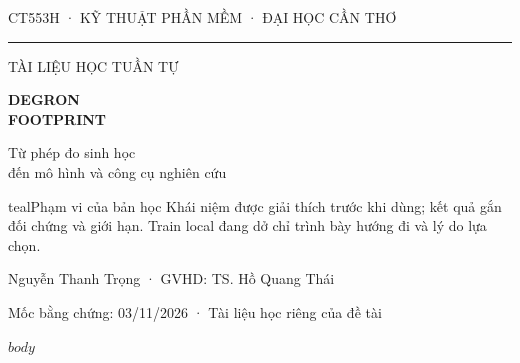 \documentclass[11pt,a4paper,oneside]{report}
\begin{document}
\begin{titlepage}
\color{ink}\sffamily
{\small CT553H · KỸ THUẬT PHẦN MỀM · ĐẠI HỌC CẦN THƠ}\par
\vspace{12mm}
{\color{teal}\rule{\textwidth}{1.3pt}}\par
\vspace{9mm}
{\fontsize{13}{17}\selectfont TÀI LIỆU HỌC TUẦN TỰ}\par
\vspace{7mm}
{\fontsize{34}{40}\selectfont\bfseries DEGRON\\FOOTPRINT}\par
\vspace{9mm}
{\fontsize{17}{23}\selectfont Từ phép đo sinh học\\đến mô hình và công cụ nghiên cứu}\par
\vspace{13mm}
\vfill
\begin{learningbox}{teal}{Phạm vi của bản học}
Khái niệm được giải thích trước khi dùng; kết quả gắn đối chứng và giới hạn.
Train local đang dở chỉ trình bày hướng đi và lý do lựa chọn.
\end{learningbox}
\vspace{4mm}
{\normalsize Nguyễn Thanh Trọng · GVHD: TS. Hồ Quang Thái}\par
\vspace{3mm}
{\small Mốc bằng chứng: 03/11/2026 · Tài liệu học riêng của đề tài}\par
\end{titlepage}
\tableofcontents
\clearpage
\listoffigures
\clearpage
{}
$body$
\end{document}
